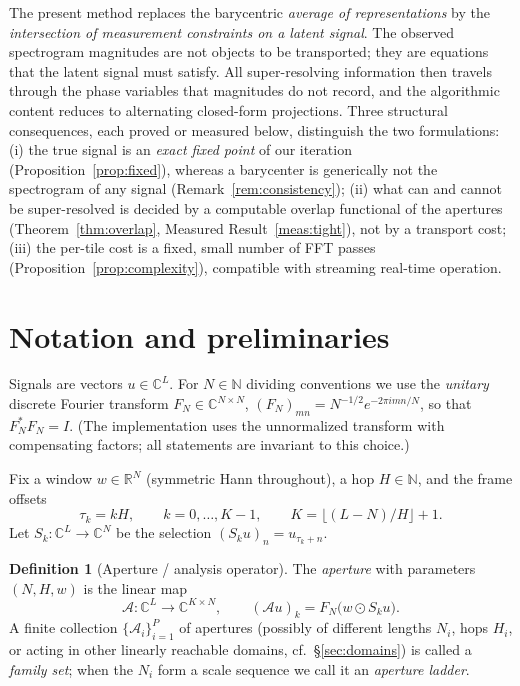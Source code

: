 \documentclass[11pt]{article}
\theoremstyle{definition}
\newtheorem{definition}[theorem]{Definition}
\newcommand{\C}{\mathbb{C}}
\newcommand{\R}{\mathbb{R}}
\newcommand{\N}{\mathbb{N}}
\newcommand{\cA}{\mathcal{A}}
\begin{document}
The present method replaces the barycentric \emph{average of
representations} by the \emph{intersection of measurement constraints on a
latent signal}.  The observed spectrogram magnitudes are not objects to be
transported; they are equations that the latent signal must satisfy.  All
super-resolving information then travels through the phase variables that
magnitudes do not record, and the algorithmic content reduces to alternating
closed-form projections.  Three structural consequences, each proved or
measured below, distinguish the two formulations:
(i) the true signal is an \emph{exact fixed point} of our iteration
(Proposition~\ref{prop:fixed}), whereas a barycenter is generically not the
spectrogram of any signal (Remark~\ref{rem:consistency});
(ii) what can and cannot be super-resolved is decided by a computable
overlap functional of the apertures (Theorem~\ref{thm:overlap},
Measured Result~\ref{meas:tight}), not by a transport cost;
(iii) the per-tile cost is a fixed, small number of FFT passes
(Proposition~\ref{prop:complexity}), compatible with streaming real-time
operation.

\section{Notation and preliminaries}

Signals are vectors $u\in\C^{L}$.  For $N\in\N$ dividing conventions we use
the \emph{unitary} discrete Fourier transform $F_{N}\in\C^{N\times N}$,
$(F_{N})_{mn}=N^{-1/2}e^{-2\pi i mn/N}$, so that $F_{N}^{*}F_{N}=I$.  (The
implementation uses the unnormalized transform with compensating factors;
all statements are invariant to this choice.)

Fix a window $w\in\R^{N}$ (symmetric Hann throughout), a hop $H\in\N$, and
the frame offsets
\[
  \tau_{k}=kH,\qquad k=0,\dots,K-1,\qquad K=\lfloor (L-N)/H\rfloor+1 .
\]
Let $S_{k}:\C^{L}\to\C^{N}$ be the selection $(S_{k}u)_{n}=u_{\tau_{k}+n}$.

\begin{definition}[Aperture / analysis operator]\label{def:aperture}
The \emph{aperture} with parameters $(N,H,w)$ is the linear map
\[
  \cA:\C^{L}\to\C^{K\times N},\qquad
  (\cA u)_{k}=F_{N}\bigl(w\odot S_{k}u\bigr).
\]
A finite collection $\{\cA_{i}\}_{i=1}^{P}$ of apertures (possibly of
different lengths $N_{i}$, hops $H_{i}$, or acting in other linearly
reachable domains, cf.\ \S\ref{sec:domains}) is called a \emph{family set};
when the $N_{i}$ form a scale sequence we call it an \emph{aperture ladder}.
\end{definition}
\end{document}
